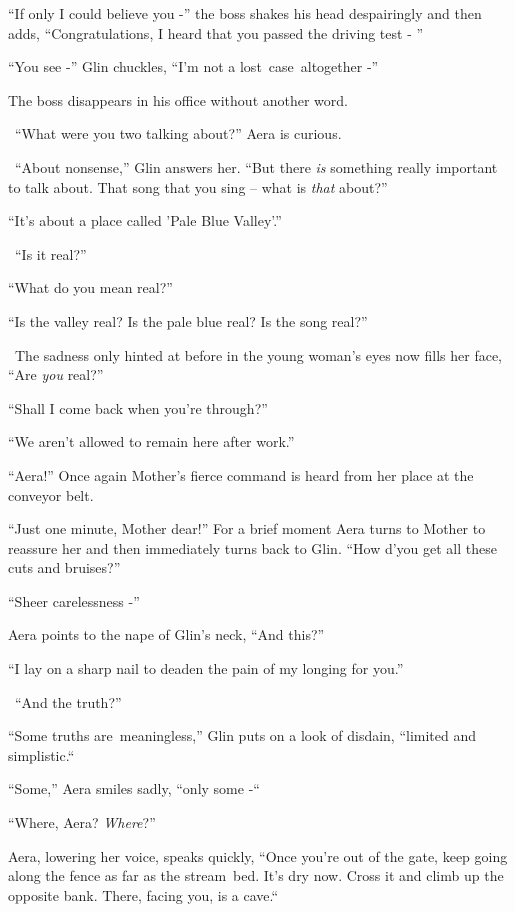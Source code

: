 \documentclass[twoside,11pt]{book}
\begin{document}
``If only I could believe you -'' the boss shakes his head despairingly and
then adds, ``Congratulations, I heard that you passed the driving test - ''

``You see -'' Glin chuckles, ``I'm not a lost\ case\ altogether
-''

The boss disappears in his office without another word.\ 

{\ }``What were you two talking about?'' Aera is curious.

~``About nonsense,'' Glin answers her. ``But there \textit{is} something really
important to talk about. That song that you sing -- what is \textit{that} about?'' 

``It's about a place called 'Pale Blue Valley'.''

~``Is it real?''

``What do you mean real?''

``Is the valley real? Is the pale blue real? Is the song real?''

~The sadness only hinted at before in the young woman's eyes now fills her face, ``Are \textit{you}
real?'' 

``Shall I come back when you're through?''

``We aren't allowed to remain here after work.''

``Aera!'' Once again Mother's fierce command is heard from her place at the conveyor belt.\ 

``Just one minute, Mother dear!'' For a brief moment\MakeUppercase{ a}era turns to Mother to
reassure her and then immediately turns back to Glin. ``How d'you get all these cuts and
bruises?'' 

``Sheer carelessness -''

Aera points to the nape of Glin's neck, ``And this?''

``I lay on a sharp nail to deaden the pain of my longing for you.''

~``And the truth?'' 

``Some truths are~meaningless,'' Glin puts on a look of disdain, ``limited and
simplistic.``\ 

``Some,'' Aera smiles sadly, ``only some -``~ 

``Where, Aera? \textit{Where}?''

Aera, lowering her voice, speaks quickly, ``Once you're out of the gate, keep going along the fence as far
as the stream\ bed. It's dry now. Cross it and climb up the opposite bank. There, facing you, is a
cave.``\ 
\end{document}
